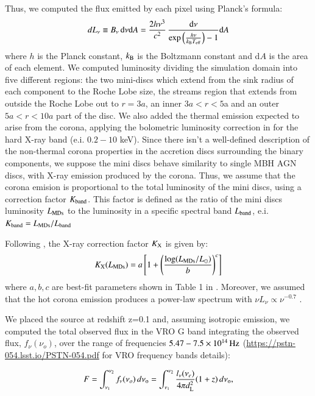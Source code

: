 \documentclass{aa}
\begin{document}
Thus, we computed the flux emitted by each pixel using Planck's formula:
\begin{equation}
    \label{eqn:planck}
    dL_{\nu} \equiv B_{\nu }  \, {\rm d}\nu {\rm d}A  = \frac {2h \nu^3}{c^2}\, \frac{{\rm d}\nu}{  \exp\left({\frac{h\nu}{k_{\rm B}T_{\rm eff}}}\right) -1 } {\rm d}A 
\end{equation}
where $h$ is the Planck constant, $k_{\rm B}$ is the Boltzmann constant and d$A$ is the area of each element. We computed luminosity dividing the simulation domain into five different regions: the two mini-discs which extend from the sink radius of each component to the Roche Lobe size, the streams region that extends from outside the Roche Lobe out to $r = 3a$, an inner $3a < r < 5$a and an outer $5a < r < 10a $ part of the disc. We also added the thermal emission expected to arise from the corona, applying the bolometric luminosity correction in \citep{Duras2020} for the hard X-ray band (e.i. $0.2-10$ keV). Since there isn't a well-defined description of the non-thermal corona properties in the accretion discs surrounding the binary components, we suppose the mini discs behave similarity to single MBH AGN discs, with X-ray emission produced by the corona. Thus, we assume that the corona emision is proportional to the total luminosity of the mini discs, using a correction factor $K_{\rm band}$. This factor is defined as the ratio of the mini discs luminosity $L_{\rm MDs}$ to the luminosity in a specific spectral band $L_{\rm band}$, e.i. $K_{\rm band} = L_{\rm MDs}/L_{\rm band}$

Following \citep{Duras2020}, the X-ray correction factor $K_{\rm X}$ is given by:
\begin{equation}
    \label{eqn:kx}
    K_{\rm X}(L_{\rm MDs}) = a \left [ 1 + \left (\frac{\log(L_{\rm MDs}/L_{\odot})}{b} \right )^c \right ]
\end{equation}
where $a,b,c$ are best-fit parameters shown in Table 1 in \citep{Duras2020}.
Moreover, we assumed that the hot corona emission produces a power-law spectrum with $\nu L_\nu\propto\nu^{-0.7}$ 
\citep{Regan2019}.


We placed the source at redshift z=0.1 and, assuming isotropic emission, we computed the total observed flux in the VRO G band integrating the observed flux, $f_{\nu}(\nu_{o})$, over the range of frequencies $5.47-7.5 \times 10^{14} \, \rm Hz$ (\url{https://pstn-054.lsst.io/PSTN-054.pdf} for VRO frequency bands details):

\begin{equation}
    \label{eqn:flux}
    F = \int_{\nu_1}^{\rm \nu_2} f_{\nu}(\nu_{o}) \, d \nu_{\rm o} = \int_{\nu_1}^{\rm \nu_2} \frac{l_{\rm \nu}(\nu_e)}{4\pi d_{\rm L }^2}(1+z) \, d \nu_{\rm o},
\end{equation}
\end{document}
